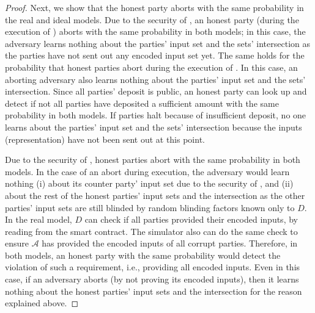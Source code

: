 \begin{proof}
Next, we show that the honest party aborts with the same probability in the real and ideal models. Due to the security of \ct, an honest party (during the execution of \ct) aborts with the same probability in both models; in this case, the adversary learns nothing about the parties' input set and the sets' intersection as the parties have not sent out any encoded input set yet.  The same holds for the probability that honest parties abort during the execution of \zspaa.  In this case, an aborting adversary also learns nothing about the parties' input set and the sets' intersection. Since all parties' deposit is public, an honest party can look up and detect if not all parties have deposited a sufficient amount with the same probability in both models. If parties halt because of insufficient deposit, no one learns about the parties' input set and the sets' intersection because the inputs (representation) have not been sent out at this point. 


Due to the security of \vopr, honest parties abort with the same probability in both models. In the case of an abort during \vopr execution, the adversary would learn nothing (i) about its counter party' input set due to the security of \vopr, and (ii) about the rest of the honest parties' input sets and the intersection as the other parties' input sets are still blinded by random blinding factors known only to $D$. In the real model, $D$ can check if all parties provided their encoded inputs, by reading from the smart contract.  The simulator also can do the same check to ensure  $\mathcal{A}$ has provided the encoded inputs of all corrupt parties. Therefore, in both models, an honest party with the same probability would detect the violation of such a requirement, i.e., providing all encoded inputs. Even in this case, if an adversary aborts (by not proving its encoded inputs), then it learns nothing about the honest parties' input sets and the intersection for the reason explained above. 



\end{proof}
